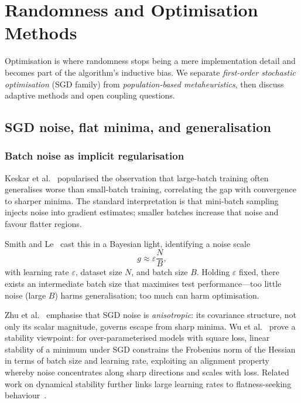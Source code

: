 \section{Randomness and Optimisation Methods}
\label{sec:opt}

Optimisation is where randomness stops being a mere implementation detail and becomes part of the algorithm's inductive bias.
We separate \emph{first-order stochastic optimisation} (SGD family) from \emph{population-based metaheuristics}, then discuss adaptive methods and open coupling questions.

\subsection{SGD noise, flat minima, and generalisation}

\subsubsection{Batch noise as implicit regularisation}

Keskar et al.~\cite{keskar2017largebatch} popularised the observation that large-batch training often generalises worse than small-batch training, correlating the gap with convergence to sharper minima.
The standard interpretation is that mini-batch sampling injects noise into gradient estimates; smaller batches increase that noise and favour flatter regions.

Smith and Le~\cite{smith2018bayesian} cast this in a Bayesian light, identifying a noise scale
\begin{equation}
  g \approx \varepsilon \frac{N}{B},
\end{equation}
with learning rate $\varepsilon$, dataset size $N$, and batch size $B$.
Holding $\varepsilon$ fixed, there exists an intermediate batch size that maximises test performance---too little noise (large $B$) harms generalisation; too much can harm optimisation.

Zhu et al.~\cite{zhu2019anisotropic} emphasise that SGD noise is \emph{anisotropic}: its covariance structure, not only its scalar magnitude, governs escape from sharp minima.
Wu et al.~\cite{wu2022alignment} prove a stability viewpoint: for over-parameterised models with square loss, linear stability of a minimum under SGD constrains the Frobenius norm of the Hessian in terms of batch size and learning rate, exploiting an alignment property whereby noise concentrates along sharp directions and scales with loss.
Related work on dynamical stability further links large learning rates to flatness-seeking behaviour~\cite{wu2023implicit}.

